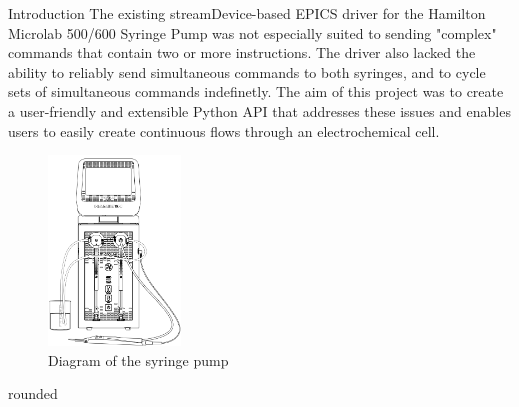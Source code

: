 \documentclass[a0paper,landscape]{baposter}
\begin{document}
\begin{poster}
\begin{posterbox}[name=introduction,column=0]{Introduction}
The existing streamDevice-based EPICS driver for the Hamilton Microlab 500/600 Syringe Pump was not
especially suited to sending "complex" commands that contain two or more instructions.
The driver also lacked the ability to reliably send simultaneous commands to both syringes, and to
cycle sets of simultaneous commands indefinetly. The aim of this project was to create a user-friendly
and extensible Python API that addresses these issues and enables users to easily create continuous flows 
through an electrochemical cell.
\begin{figure}[H]
\begin{center}
\includegraphics[width=100pt]{images/syringediagram}
\caption{Diagram of the syringe pump}
\end{center}
\end{figure}
\end{posterbox}
\begin{posterbox}[column=0,headerfont={},headershape=rounded,boxheaderheight=0em,boxColorOne=white,borderColor=white,below=introduction]{rounded}
\begin{figure}[H]
\begin{center}
\vspace{-1em}

\end{center}
\end{figure}
\end{posterbox}
\end{poster}
\end{document}
